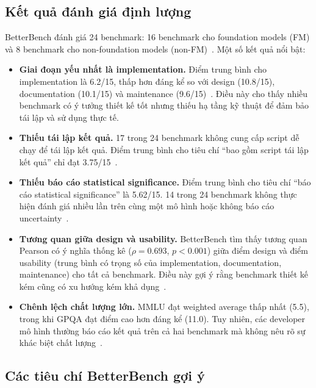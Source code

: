 \subsection{Kết quả đánh giá định lượng}

BetterBench đánh giá 24 benchmark: 16 benchmark cho foundation models (FM) và 8 benchmark cho non-foundation models (non-FM)~\cite{betterbench}. Một số kết quả nổi bật:

\begin{itemize}
    \item \textbf{Giai đoạn yếu nhất là implementation.} Điểm trung bình cho implementation là 6.2/15, thấp hơn đáng kể so với design (10.8/15), documentation (10.1/15) và maintenance (9.6/15)~\cite{betterbench}. Điều này cho thấy nhiều benchmark có ý tưởng thiết kế tốt nhưng thiếu hạ tầng kỹ thuật để đảm bảo tái lập và sử dụng thực tế.

    \item \textbf{Thiếu tái lập kết quả.} 17 trong 24 benchmark không cung cấp script dễ chạy để tái lập kết quả. Điểm trung bình cho tiêu chí ``bao gồm script tái lập kết quả'' chỉ đạt 3.75/15~\cite{betterbench}.

    \item \textbf{Thiếu báo cáo statistical significance.} Điểm trung bình cho tiêu chí ``báo cáo statistical significance'' là 5.62/15. 14 trong 24 benchmark không thực hiện đánh giá nhiều lần trên cùng một mô hình hoặc không báo cáo uncertainty~\cite{betterbench}.

    \item \textbf{Tương quan giữa design và usability.} BetterBench tìm thấy tương quan Pearson có ý nghĩa thống kê ($\rho = 0.693$, $p < 0.001$) giữa điểm design và điểm usability (trung bình có trọng số của implementation, documentation, maintenance) cho tất cả benchmark. Điều này gợi ý rằng benchmark thiết kế kém cũng có xu hướng kém khả dụng~\cite{betterbench}.

    \item \textbf{Chênh lệch chất lượng lớn.} MMLU đạt weighted average thấp nhất (5.5), trong khi GPQA đạt điểm cao hơn đáng kể (11.0). Tuy nhiên, các developer mô hình thường báo cáo kết quả trên cả hai benchmark mà không nêu rõ sự khác biệt chất lượng~\cite{betterbench}.
\end{itemize}

\subsection{Các tiêu chí BetterBench gợi ý}

